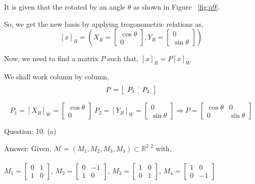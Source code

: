 \documentclass[a4paper]{article}
\begin{document}
\begin{qalist}
			It is given that the rotated by an angle $\theta$ as shown in Figure ~\ref{fig:q9}. 
			
			So, we get the new basis by applying trogonometric relations as, 
			\begin{equation} {[x]}_{R} = 
				\left(
					{X}_{R} = \begin{bmatrix}\cos\theta \\ 0\end{bmatrix},
					{Y}_{R} = \begin{bmatrix}0 \\ \sin\theta\end{bmatrix}
				\right)
			\end{equation}
			
			Now, we need to find a matrix $P$ such that,  ${[x]}_{R} = P{[x]}_{W}$
			
			We shall work column by column, 
			\renewcommand{\arraystretch}{1.5}
			\begin{equation}P = \left[\begin{array}{c:c} {P}_{1} &  {P}_{2}\end{array}\right]\end{equation}
			
			\begin{equation}{P}_{1} = {[{X}_{R}]}_{W} = \begin{bmatrix}\cos\theta \\ 0\end{bmatrix} \;
			{P}_{2} = {[{Y}_{R}]}_{W} = \begin{bmatrix}0 \\ \sin\theta\end{bmatrix}
			\Rightarrow P = \begin{bmatrix} \cos\theta & 0 \\ 0 & \sin\theta\end{bmatrix}\end{equation}
			
		
		\item[Question: 10. (a) ] \setcounter{equation}{0} %
		\item[Answer:] Given,
			$\mathcal{M} = ({M}_{1}, {M}_{2}, {M}_{3}, {M}_{4}) \subset {\mathbb{R}}^{2,2}$ with, \\ \\
			${M}_{1} = \begin{bmatrix}0 & 1 \\ 1 & 0\end{bmatrix}$,	${M}_{2} = \begin{bmatrix}0 & -1 \\ 1 & 0\end{bmatrix}$,	${M}_{3} = \begin{bmatrix}1 & 0 \\ 0 & 1\end{bmatrix}$,	${M}_{4} = \begin{bmatrix}1 & 0 \\ 0 & -1\end{bmatrix}$ 
			

\end{qalist}
\end{document}
